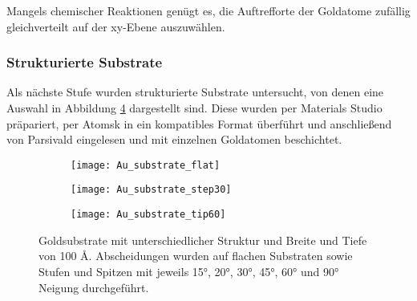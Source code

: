 Mangels chemischer Reaktionen genügt es, die Auftrefforte der Goldatome zufällig gleichverteilt auf der xy-Ebene auszuwählen.

\subsubsection{Strukturierte Substrate}

Als nächste Stufe wurden strukturierte Substrate untersucht, von denen eine Auswahl in Abbildung \ref{fig:goldsubstrate} dargestellt sind.
Diese wurden per Materials Studio präpariert, per Atomsk in ein kompatibles Format überführt und anschließend von Parsivald eingelesen und mit einzelnen Goldatomen beschichtet.

\begin{figure}[bt]
  \captionsetup[subfigure]{singlelinecheck=false}
  \def\subfigwidth{0.31\textwidth}
  \begin{subfigure}[t]{\subfigwidth}
    \texttt{[image: Au\_substrate\_flat]}
    \label{fig:goldsubstrate-a}
  \end{subfigure}
  \hfill
  \begin{subfigure}[t]{\subfigwidth}
    \texttt{[image: Au\_substrate\_step30]}
    \label{fig:goldsubstrate-a}
  \end{subfigure}
  \hfill
  \begin{subfigure}[t]{\subfigwidth}
    \texttt{[image: Au\_substrate\_tip60]}
    \label{fig:goldsubstrate-a}
  \end{subfigure}
  \caption[Strukturierte Goldsubstrate]{Goldsubstrate mit unterschiedlicher Struktur und Breite und Tiefe von 100 \AA.
    Abscheidungen wurden auf flachen Substraten sowie Stufen und Spitzen mit jeweils 15°, 20°, 30°, 45°, 60° und 90° Neigung durchgeführt.}
  \label{fig:goldsubstrate}
\end{figure}

